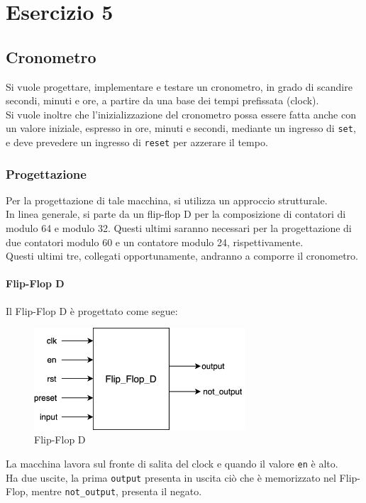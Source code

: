 \chapter{Esercizio 5}
\section{Cronometro}
Si vuole progettare, implementare e testare un cronometro, in grado di scandire secondi, minuti e ore, a partire da una base dei tempi prefissata (clock). \\
Si vuole inoltre che l'inizializzazione del cronometro possa essere fatta anche con un valore iniziale, espresso in ore, minuti e secondi, mediante un ingresso di \texttt{set}, e deve prevedere un ingresso di \texttt{reset} per azzerare il tempo.

\subsection{Progettazione}
Per la progettazione di tale macchina, si utilizza un approccio strutturale.\\
In linea generale, si parte da un flip-flop D per la composizione di contatori di modulo 64 e modulo 32. Questi ultimi saranno necessari per la progettazione di due contatori modulo 60 e un contatore modulo 24, rispettivamente.\\
Questi ultimi tre, collegati opportunamente, andranno a comporre il cronometro.

\subsubsection{Flip-Flop D}
Il Flip-Flop D è progettato come segue:
\begin{figure}[H]
	\centering
	\includegraphics[width=0.7\textwidth]{img/ffD}
	\caption{Flip-Flop D}
	\label{ffd} 
\end{figure}
La macchina lavora sul fronte di salita del clock e quando il valore \texttt{en} è alto. \\
Ha due uscite, la prima \texttt{output} presenta in uscita ciò che è memorizzato nel Flip-Flop, mentre \texttt{not\_output}, presenta il negato.

